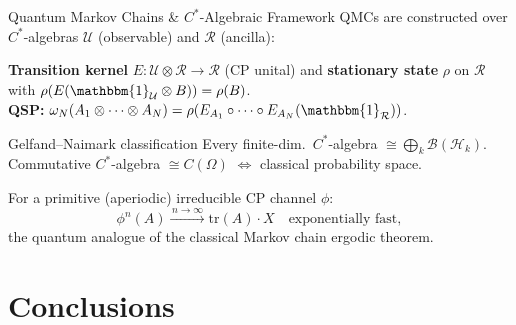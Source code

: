 \documentclass{beamer}
\newcommand{\Hilb}{\mathcal{H}}
\newcommand{\Bound}{\mathcal{B}}
\newcommand{\tr}{\mathrm{tr}}
\begin{document}
\begin{frame}[shrink=10]{Quantum Markov Chains \& $C^*$-Algebraic Framework}
  \small
  QMCs are constructed over $C^*$-algebras $\mathcal{U}$ (observable) and $\mathcal{R}$ (ancilla):
  \begin{tcolorbox}[mathbox, left=3pt, right=3pt, top=2pt, bottom=2pt]
    \textbf{Transition kernel} $E:\mathcal{U}\otimes\mathcal{R}\to\mathcal{R}$ (CP unital) and
    \textbf{stationary state} $\rho$ on $\mathcal{R}$ with $\rho(E(\mathbbm{1}_\mathcal{U}\otimes B))=\rho(B)$.\\[2pt]
    \textbf{QSP:} $\omega_N(A_1\otimes\cdots\otimes A_N)=\rho(E_{A_1}\circ\cdots\circ E_{A_N}(\mathbbm{1}_\mathcal{R}))$.
  \end{tcolorbox}

  \begin{block}{Gelfand--Naimark classification}
    Every finite-dim.\ $C^*$-algebra $\cong \bigoplus_k\Bound(\Hilb_k)$.
    Commutative $C^*$-algebra $\cong C(\Omega)$ $\Leftrightarrow$ classical probability space.
  \end{block}

  \begin{tcolorbox}[thmbox={Ergodic theorem for primitive channels}, left=3pt, right=3pt, top=2pt, bottom=2pt]
    For a primitive (aperiodic) irreducible CP channel $\phi$:
    \[
      \phi^n(A)\xrightarrow{\,n\to\infty\,}\tr(A)\cdot X \quad \text{exponentially fast},
    \]
    the quantum analogue of the classical Markov chain ergodic theorem.
  \end{tcolorbox}
\end{frame}

\section*{Conclusions}
\end{document}
